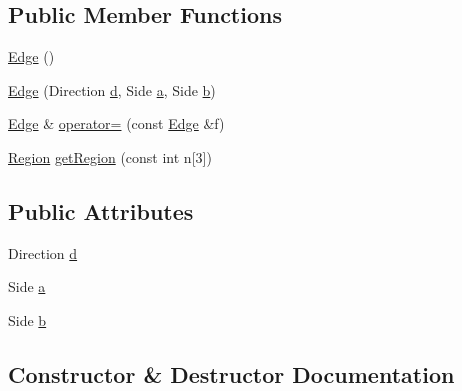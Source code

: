 \subsection*{Public Member Functions}
\begin{DoxyCompactItemize}
\item 
\hyperlink{struct_dependency_cube_m_p_i_1_1_edge_a4300ae373dfb130d69654ba7dc54b42c}{Edge} ()
\item 
\hyperlink{struct_dependency_cube_m_p_i_1_1_edge_aa9e7ee251e0259c647dc41a193e1cf6f}{Edge} (Direction \hyperlink{struct_dependency_cube_m_p_i_1_1_edge_a8669784b9f597960def87cc96ebd0e1f}{d}, Side \hyperlink{struct_dependency_cube_m_p_i_1_1_edge_a08c5f45fa42aa4b3d2177c07f00eb076}{a}, Side \hyperlink{struct_dependency_cube_m_p_i_1_1_edge_a017525e4ab3ec35aa19a4de2c7b6ebc1}{b})
\item 
\hyperlink{struct_dependency_cube_m_p_i_1_1_edge}{Edge} \& \hyperlink{struct_dependency_cube_m_p_i_1_1_edge_a5c268dbc2c12757dadfc0416efc468a1}{operator=} (const \hyperlink{struct_dependency_cube_m_p_i_1_1_edge}{Edge} \&f)
\item 
\hyperlink{struct_region}{Region} \hyperlink{struct_dependency_cube_m_p_i_1_1_edge_a8964aa3679c17660a3647a83514c348d}{get\+Region} (const int n\mbox{[}3\mbox{]})
\end{DoxyCompactItemize}
\subsection*{Public Attributes}
\begin{DoxyCompactItemize}
\item 
Direction \hyperlink{struct_dependency_cube_m_p_i_1_1_edge_a8669784b9f597960def87cc96ebd0e1f}{d}
\item 
Side \hyperlink{struct_dependency_cube_m_p_i_1_1_edge_a08c5f45fa42aa4b3d2177c07f00eb076}{a}
\item 
Side \hyperlink{struct_dependency_cube_m_p_i_1_1_edge_a017525e4ab3ec35aa19a4de2c7b6ebc1}{b}
\end{DoxyCompactItemize}


\subsection{Constructor \& Destructor Documentation}
\hypertarget{struct_dependency_cube_m_p_i_1_1_edge_a4300ae373dfb130d69654ba7dc54b42c}{}
